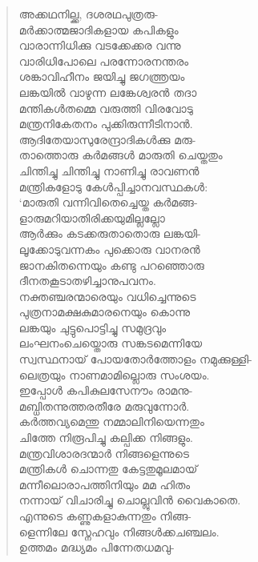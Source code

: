 \begin{verse}
അക്കഥനില്ക്ക, ദശരഥപുത്രരു-\\
മര്‍ക്കാത്മജാദികളായ കപികളും\\
വാരാന്നിധിക്കു വടക്കേക്കര വന്നു\\
വാരിധിപോലെ പരന്നോരനന്തരം\\
ശങ്കാവിഹീനം ജയിച്ചു ജഗത്ത്രയം\\
ലങ്കയില്‍ വാഴുന്ന ലങ്കേശ്വരന്‍ തദാ\\
മന്തികള്‍തമ്മെ വരുത്തി വിരവോടു\\
മന്ത്രനികേതനം പുക്കിരുന്നീടിനാന്‍.\\
ആദിതേയാസുരേന്ദ്രാദികള്‍ക്കു മരു-\\
താത്തൊരു കര്‍മങ്ങള്‍ മാരുതി ചെയ്തതും\\
ചിന്തിച്ചു ചിന്തിച്ചു നാണിച്ചു രാവണന്‍\\
മന്ത്രികളോടു കേള്‍പ്പിച്ചാനവസ്ഥകള്‍:\\
‘മാരുതി വന്നിവിതെച്ചെയ്ത കര്‍മങ്ങ-\\
ളാരുമറിയാതിരിക്കയുമില്ലല്ലോ\\
ആര്‍ക്കും കടക്കരുതാതൊരു ലങ്കയി-\\
ലൂക്കോടുവന്നകം പുക്കൊരു വാനരന്‍\\
ജാനകിതന്നെയും കണ്ടു പറഞ്ഞൊരു\\
ദീനതകൂടാതഴിച്ചാനുപവനം.\\
നക്തഞ്ചരന്മാരെയും വധിച്ചെന്നുടെ\\
പുത്രനാമക്ഷകുമാരനെയും കൊന്നു\\
ലങ്കയും ചുട്ടുപൊട്ടിച്ചു സമുദ്രവും\\
ലംഘനംചെയ്തൊരു സങ്കടമെന്നിയേ\\
സ്വസ്ഥനായ് പോയതോര്‍ത്തോളം നമുക്കുള്ളി-\\
ലെത്രയും നാണമാമില്ലൊരു സംശയം.\\
ഇപ്പോള്‍ കപികുലസേനൗം രാമനു-\\
മബ്ധിതന്നുത്തരതീരേ മരുവുന്നോര്‍.\\
കര്‍ത്തവ്യമെന്തു നമ്മാലിനിയെന്നതും\\
ചിത്തേ നിരൂപിച്ചു കല്പിക്ക നിങ്ങളും.\\
മന്ത്രവിശാരദന്മാര്‍ നിങ്ങളെന്നുടെ\\
മന്ത്രികള്‍ ചൊന്നതു കേട്ടതുമൂലമായ്\\
മന്നീലൊരാപത്തിനിയും മമ ഹിതം\\
നന്നായ് വിചാരിച്ചു ചൊല്ലുവിന്‍ വൈകാതെ.\\
എന്നുടെ കണ്ണുകളാകുന്നതും നിങ്ങ-\\
ളെന്നിലേ സ്നേഹവും നിങ്ങള്‍ക്കചഞ്ചലം.\\
ഉത്തമം മദ്ധ്യമം പിന്നേതധമവു-\\

\end{verse}
